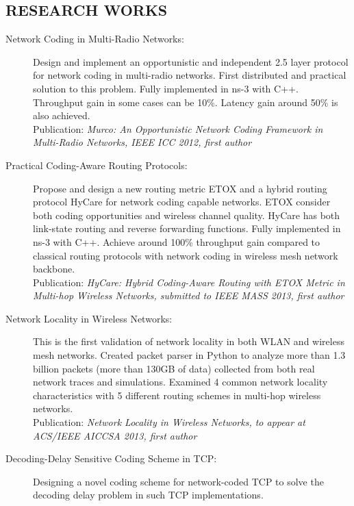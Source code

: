 \documentclass[line]{res}
\begin{document}
\begin{resume}
	\section{RESEARCH WORKS}
	\begin{description}
		\item[Network Coding in Multi-Radio Networks:]
			Design and implement an opportunistic and independent 2.5 layer protocol for network coding in multi-radio networks. First distributed and practical solution to this problem. Fully implemented in ns-3 with C++. Throughput gain in some cases can be 10\%. Latency gain around 50\% is also achieved. \\
			Publication: \emph{Murco: An Opportunistic Network Coding Framework in Multi-Radio Networks, IEEE ICC 2012, first author}
		\item[Practical Coding-Aware Routing Protocols:]
			Propose and design a new routing metric ETOX and a hybrid routing protocol HyCare for network coding capable networks. ETOX consider both coding opportunities and wireless channel quality. HyCare has both link-state routing and reverse forwarding functions. Fully implemented in ns-3 with C++. Achieve around 100\% throughput gain compared to classical routing protocols with network coding in wireless mesh network backbone.\\
			Publication: \emph{HyCare: Hybrid Coding-Aware Routing with ETOX Metric in Multi-hop Wireless Networks, submitted to IEEE MASS 2013, first author}
		\item[Network Locality in Wireless Networks:]
			This is the first validation of network locality in both WLAN and wireless mesh networks. Created packet parser in Python to analyze more than 1.3 billion packets (more than 130GB of data) collected from both real network traces and simulations. Examined 4 common network locality characteristics with 5 different routing schemes in multi-hop wireless networks.\\
			Publication: \emph{Network Locality in Wireless Networks, to appear at ACS/IEEE AICCSA 2013, first author}
		\item [Decoding-Delay Sensitive Coding Scheme in TCP:]
			Designing a novel coding scheme for network-coded TCP to solve the decoding delay problem in such TCP implementations.
	\end{description}
	

\end{resume}
\end{document}
